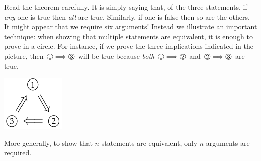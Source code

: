 \begin{minipage}{0.8\textwidth}
Read the theorem carefully. It is simply saying that, of the three statements, if \emph{any} one is true then \emph{all} are true. Similarly, if one is false then so are the others. It might appear that we require six arguments! Instead we illustrate an important technique: when showing that multiple statements are equivalent, it is enough to prove in a circle. For instance, if we prove the three implications indicated in the picture, then $\circint 1\Longrightarrow \circint 3$ will be true because \emph{both} $\circint 1\Longrightarrow \circint 2$ and $\circint 2\Longrightarrow \circint 3$ are true.\\
\end{minipage}\qquad
\begin{minipage}{0.15\textwidth}
\includegraphics[width=\textwidth]{sets-14-circlearg}
\end{minipage}

 More generally, to show that $n$ statements are equivalent, only $n$ arguments are required.

